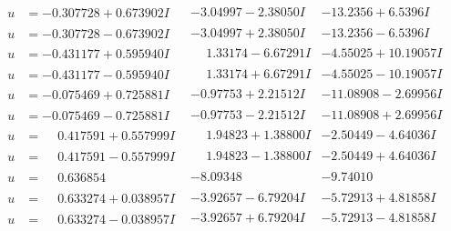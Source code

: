 \documentclass[1p]{elsarticle_modified}
\theoremstyle{definition}
\begin{document}
$$\begin{array}{c|c|c}
\begin{aligned}
u &= -0.307728 + 0.673902 I\end{aligned}
 & -3.04997 - 2.38050 I & -13.2356 + 6.5396 I \\ \hline\begin{aligned}
u &= -0.307728 - 0.673902 I\end{aligned}
 & -3.04997 + 2.38050 I & -13.2356 - 6.5396 I \\ \hline\begin{aligned}
u &= -0.431177 + 0.595940 I\end{aligned}
 & \phantom{-}1.33174 - 6.67291 I & -4.55025 + 10.19057 I \\ \hline\begin{aligned}
u &= -0.431177 - 0.595940 I\end{aligned}
 & \phantom{-}1.33174 + 6.67291 I & -4.55025 - 10.19057 I \\ \hline\begin{aligned}
u &= -0.075469 + 0.725881 I\end{aligned}
 & -0.97753 + 2.21512 I & -11.08908 - 2.69956 I \\ \hline\begin{aligned}
u &= -0.075469 - 0.725881 I\end{aligned}
 & -0.97753 - 2.21512 I & -11.08908 + 2.69956 I \\ \hline\begin{aligned}
u &= \phantom{-}0.417591 + 0.557999 I\end{aligned}
 & \phantom{-}1.94823 + 1.38800 I & -2.50449 - 4.64036 I \\ \hline\begin{aligned}
u &= \phantom{-}0.417591 - 0.557999 I\end{aligned}
 & \phantom{-}1.94823 - 1.38800 I & -2.50449 + 4.64036 I \\ \hline\begin{aligned}
u &= \phantom{-}0.636854\phantom{ +0.000000I}\end{aligned}
 & -8.09348\phantom{ +0.000000I} & -9.74010\phantom{ +0.000000I} \\ \hline\begin{aligned}
u &= \phantom{-}0.633274 + 0.038957 I\end{aligned}
 & -3.92657 - 6.79204 I & -5.72913 + 4.81858 I \\ \hline\begin{aligned}
u &= \phantom{-}0.633274 - 0.038957 I\end{aligned}
 & -3.92657 + 6.79204 I & -5.72913 - 4.81858 I \\ \hline\begin{aligned}

\end{aligned}
\end{array}$$
\end{document}
